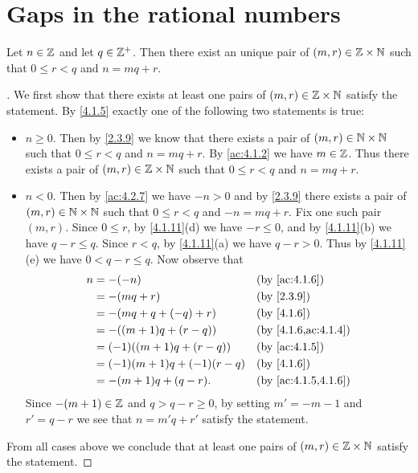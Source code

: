 \section{Gaps in the rational numbers}\label{sec:4.4}

\begin{ac}\label{ac:4.4.1}
  Let \(n \in \mathbb{Z}\) and let \(q \in \mathbb{Z}^+\).
  Then there exist an unique pair of \((m, r) \in \mathbb{Z} \times \mathbb{N}\) such that \(0 \leq r < q\) and \(n = mq + r\).
\end{ac}

\begin{proof}[]
  We first show that there exists at least one pairs of \((m, r) \in \mathbb{Z} \times \mathbb{N}\) satisfy the statement.
  By \cref{4.1.5} exactly one of the following two statements is true:
  \begin{itemize}
    \item \(n \geq 0\).
          Then by \cref{2.3.9} we know that there exists a pair of \((m, r) \in \mathbb{N} \times \mathbb{N}\) such that \(0 \leq r < q\) and \(n = mq + r\).
          By \cref{ac:4.1.2} we have \(m \in \mathbb{Z}\).
          Thus there exists a pair of \((m, r) \in \mathbb{Z} \times \mathbb{N}\) such that \(0 \leq r < q\) and \(n = mq + r\).
    \item \(n < 0\).
          Then by \cref{ac:4.2.7} we have \(-n > 0\) and by \cref{2.3.9} there exists a pair of \((m, r) \in \mathbb{N} \times \mathbb{N}\) such that \(0 \leq r < q\) and \(-n = mq + r\).
          Fix one such pair \((m, r)\).
          Since \(0 \leq r\), by \cref{4.1.11}(d) we have \(-r \leq 0\), and by \cref{4.1.11}(b) we have \(q - r \leq q\).
          Since \(r < q\), by \cref{4.1.11}(a) we have \(q - r > 0\).
          Thus by \cref{4.1.11}(e) we have \(0 < q - r \leq q\).
          Now observe that
          \begin{align*}
            n & = -(-n)                         &  & \by{ac:4.1.6}       \\
              & = -(mq + r)                     &  & \by{2.3.9}          \\
              & = -(mq + q + (-q) + r)          &  & \by{4.1.6}          \\
              & = -((m + 1) q + (r - q))        &  & \by{4.1.6,ac:4.1.4} \\
              & = (-1) ((m + 1) q + (r - q))    &  & \by{ac:4.1.5}       \\
              & = (-1) (m + 1) q + (-1) (r - q) &  & \by{4.1.6}          \\
              & = -(m + 1) q + (q - r).         &  & \by{ac:4.1.5,4.1.6}
          \end{align*}
          Since \(-(m + 1) \in \mathbb{Z}\) and \(q > q - r \geq 0\), by setting \(m' = -m - 1\) and \(r' = q - r\) we see that \(n = m'q + r'\) satisfy the statement.
  \end{itemize}
  From all cases above we conclude that at least one pairs of \((m, r) \in \mathbb{Z} \times \mathbb{N}\) satisfy the statement.


\end{proof}
